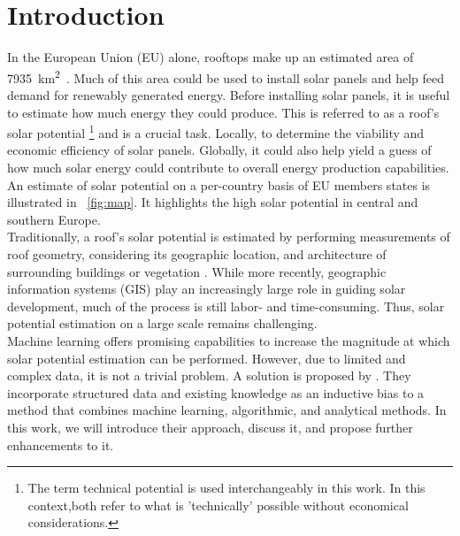 \documentclass{article} %
\newcommand{\figref}[1]{\figurename~\ref{#1}}
\begin{document}
\section*{Introduction}
In the European Union (EU) alone, rooftops make up an estimated area of \SI{7935}{\kilo\metre\squared}~\cite{bodis2019high}. Much of this area could be used to install solar panels and help feed demand for renewably generated energy. Before installing solar panels, it is useful to estimate how much energy they could produce. This is referred to as a roof's solar potential \footnote{The term technical potential is used interchangeably in this work. In this context,both refer to what is 'technically' possible without economical considerations.} and is a crucial task. Locally, to determine the viability and economic efficiency of solar panels. Globally, it could also help yield a guess of how much solar energy could contribute to overall energy production capabilities. An estimate of solar potential on a per-country basis of EU members states is illustrated in \figref{fig:map}. It highlights the high solar potential in central and southern Europe.\\
Traditionally, a roof's solar potential is estimated by performing measurements of roof geometry, considering its geographic location, and architecture of surrounding buildings or vegetation \cite{freitas2015modelling}. While more recently, geographic information systems (GIS) play an increasingly large role in guiding solar development, much of the process is still labor- and time-consuming. Thus, solar potential estimation on a large scale remains challenging.\\
Machine learning offers promising capabilities to increase the magnitude at which solar potential estimation can be performed. However, due to limited and complex data, it is not a trivial problem. A solution is proposed by \citet{de2021predicting}. They incorporate structured data and existing knowledge as an inductive bias to a method that combines machine learning, algorithmic, and analytical methods. In this work, we will introduce their approach, discuss it, and propose further enhancements to it.
\end{document}
